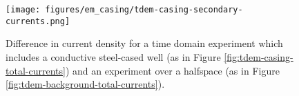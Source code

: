 \begin{figure}
    \begin{center}
    \texttt{[image: figures/em\_casing/tdem-casing-secondary-currents.png]}
    \end{center}
\caption{
    Difference in current density for a time domain experiment which includes a conductive steel-cased well (as in Figure \ref{fig:tdem-casing-total-currents}) and an experiment over a halfspace (as in Figure \ref{fig:tdem-background-total-currents}).
}
\label{fig:tdem-casing-secondary-currents}
\end{figure}



